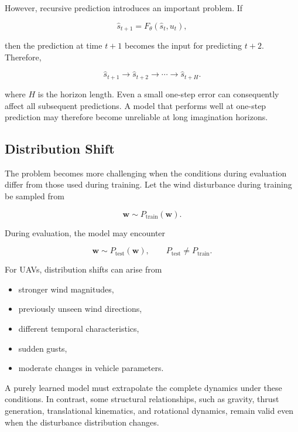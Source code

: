 \documentclass[conference]{IEEEtran}
\begin{document}
However, recursive prediction introduces an important problem. If

\begin{equation}
\hat{s}_{t+1}
=
F_{\theta}(\hat{s}_t,u_t),
\end{equation}

then the prediction at time $t+1$ becomes the input for predicting
$t+2$. Therefore,

\begin{equation}
\hat{s}_{t+1}
\rightarrow
\hat{s}_{t+2}
\rightarrow
\cdots
\rightarrow
\hat{s}_{t+H}.
\end{equation}

where \(H\) is the horizon length. Even a small one-step error can consequently affect all subsequent
predictions. A model that performs well at one-step prediction may
therefore become unreliable at long imagination horizons.


\subsection{Distribution Shift}

The problem becomes more challenging when the conditions during
evaluation differ from those used during training. Let the wind disturbance during training be sampled from

\begin{equation}
\mathbf{w}\sim P_{\mathrm{train}}(\mathbf{w}).
\end{equation}

During evaluation, the model may encounter

\begin{equation}
\mathbf{w}\sim P_{\mathrm{test}}(\mathbf{w}),
\qquad
P_{\mathrm{test}}\neq P_{\mathrm{train}}.
\end{equation}

For UAVs, distribution shifts can arise from

\begin{itemize}
    \item stronger wind magnitudes,
    \item previously unseen wind directions,
    \item different temporal characteristics,
    \item sudden gusts,
    \item moderate changes in vehicle parameters.
\end{itemize}

A purely learned model must extrapolate the complete dynamics under
these conditions. In contrast, some structural relationships, such as
gravity, thrust generation, translational kinematics, and rotational
dynamics, remain valid even when the disturbance distribution changes.
\end{document}
